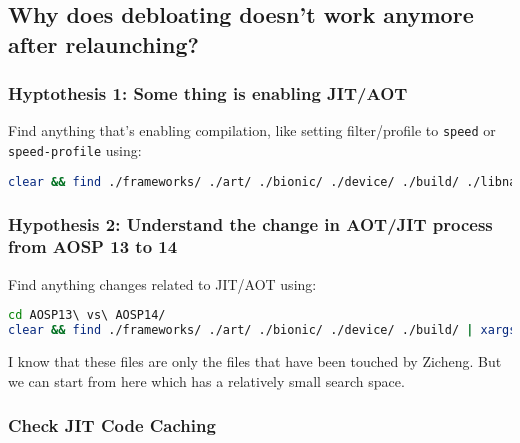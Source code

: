 \label{task:20240617_aosp}

\subsection{Why does debloating doesn't work anymore after relaunching?}

\subsubsection{Hyptothesis 1: Some thing is enabling JIT/AOT}

Find anything that's enabling compilation, like setting filter/profile to \texttt{speed} or \texttt{speed-profile} using:
\begin{lstlisting}[language=bash]
clear && find ./frameworks/ ./art/ ./bionic/ ./device/ ./build/ ./libnativehelper \( -iname '*.java' -o -iname '*.cpp' -o -iname '*.cc' -o -iname '*.hpp' -o -iname '*.h' -o -iname '*.S' -o -iname '*.mk' \) -a ! -iname '*test*' -a ! -iname '*out*' | xargs grep --color -sin 'speed-profile'
\end{lstlisting}

\subsubsection{Hypothesis 2: Understand the change in AOT/JIT process from AOSP 13 to 14}

Find anything changes related to JIT/AOT using:
\begin{lstlisting}[language=bash]
cd AOSP13\ vs\ AOSP14/
clear && find ./frameworks/ ./art/ ./bionic/ ./device/ ./build/ | xargs grep --color -sin 'jit'
\end{lstlisting}
I know that these files are only the files that have been touched by Zicheng. But we can start from here which has a relatively small search space.

\subsubsection{Check JIT Code Caching}

